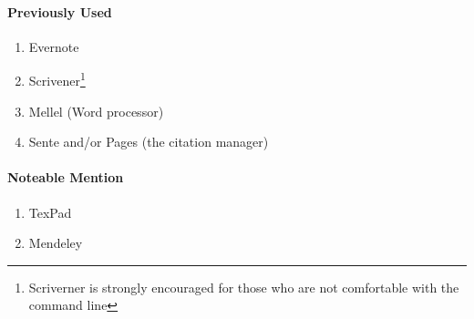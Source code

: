 \documentclass{tufte-handout}
\begin{document}
\paragraph{Previously Used} %
\label{par:previously_used}

\begin{enumerate}
  \item[] Evernote
  \item[] Scrivener\footnote{Scriverner is strongly encouraged for those who are not comfortable with the command line}
  \item[] Mellel (Word processor)
  \item[] Sente and/or Pages (the citation manager)
\end{enumerate}


\paragraph{Noteable Mention} %
\label{par:noteable_mention}

\begin{enumerate}
  \item[] TexPad
  \item[] Mendeley
\end{enumerate}
\nocite{*}

\renewcommand{\bibname}{Further Reading} 


\end{document}

